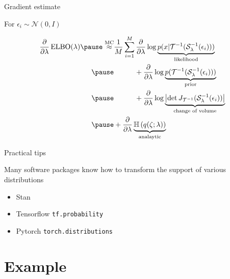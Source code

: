 \begin{frame}{Gradient estimate}

	
	\begin{small}
	For $\epsilon_i \sim \mathcal N(0, I)$
	
	\begin{equation*}
		\begin{aligned}
		\pdv{\lambda}\ELBO(\lambda) \pause \overset{\text{MC}}{\approx}& \frac{1}{M} \sum_{i=1}^M \pdv{\lambda} \log \underbrace{p(x|\inv{\mathcal T}(\inv{\mathcal S}_\lambda(\epsilon_i)))}_{\text{likelihood}} \\ \pause
		&\phantom{\frac{1}{M} \sum}+ \pdv{\lambda} \log \underbrace{p(\inv{\mathcal T}(\inv{\mathcal S}_\lambda(\epsilon_i)))}_{\text{prior}} \\ \pause
		&\phantom{\frac{1}{M} \sum}+ \pdv{\lambda} \log \underbrace{\djac{\inv{\mathcal T}}{\inv{\mathcal S}_\lambda(\epsilon_i)}}_{\text{change of volume}} \\ \pause
		&+ \pdv{\lambda} \underbrace{\Ent{q(\zeta; \lambda)}}_{\text{analaytic}}
		\end{aligned}
	\end{equation*}
	
	\end{small}

\end{frame}

\begin{frame}{Practical tips}

	Many software packages know how to transform the support of various distributions
	\begin{itemize}
		\item Stan
		\item Tensorflow \texttt{tf.probability}
		\item Pytorch \texttt{torch.distributions}
	\end{itemize}
\end{frame}

\section{Example}


